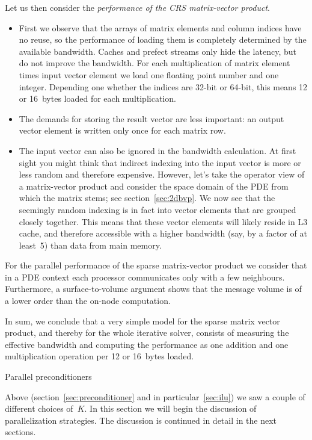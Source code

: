 Let us then consider the \emph{performance of the CRS matrix-vector
  product}.
\begin{itemize}
\item First we observe that the arrays of matrix elements and column indices have no reuse,
  so the performance of loading them is completely determined by the available bandwidth.
  Caches and prefect streams only hide the latency, but do not improve the bandwidth.
  For
  each multiplication of matrix element times input vector element
  we load one floating point number and one integer. Depending one whether the
  indices are 32-bit or 64-bit, this means 12 or 16~bytes loaded for each multiplication.
\item The demands for storing the result vector are less important: an output vector
  element is written only once for each matrix row.
\item The input vector can also be ignored in the bandwidth calculation.
  At first sight you might think that indirect indexing
  into the input vector is more or less random and therefore expensive.
  However, let's take the operator view of a matrix-vector product
  and consider the space domain of the \ac{PDE} from which the matrix stems;
  see section~\ref{sec:2dbvp}. We now see that the seemingly random indexing
  is in fact into vector elements that are grouped closely together.
  This means that these vector elements will likely reside in L3 cache,
  and therefore accessible with a higher bandwidth (say, by a factor of at least~5)
  than data from main memory.
\end{itemize}
For the parallel performance of the sparse matrix-vector product we
consider that in a \ac{PDE} context each processor communicates only
with a few neighbours. Furthermore, a surface-to-volume argument
shows that the message volume is of a lower order than the on-node
computation.

In sum, we conclude that a very simple model for the sparse matrix vector product,
and thereby for the whole iterative solver, consists of measuring
the effective bandwidth and computing the performance as one
addition and one multiplication operation per 12 or 16~bytes loaded.

 {Parallel preconditioners}
\label{sec:parallel-prec}

Above (section~\ref{sec:preconditioner} and in particular~\ref{sec:ilu}) we saw a
couple of different choices of~$K$. In this section we will begin the
discussion of parallelization strategies. The discussion is continued
in detail in the next sections.

